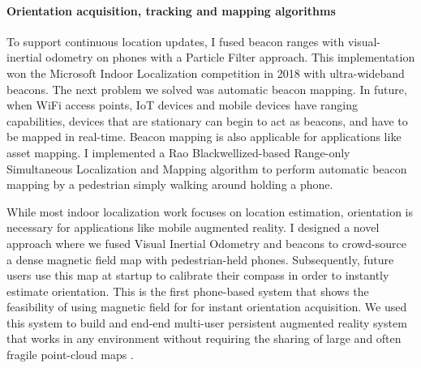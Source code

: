 \documentclass[10pt]{article}
\begin{document}

\paragraph{Orientation acquisition, tracking and mapping algorithms}


To support continuous location updates, I fused beacon ranges with visual-inertial odometry on phones with a Particle Filter approach. This implementation won the Microsoft Indoor Localization competition in 2018 with ultra-wideband beacons. The next problem we solved was automatic beacon mapping. In future, when WiFi access points, IoT devices and mobile devices have ranging capabilities, devices that are stationary can begin to act as beacons, and have to be mapped in real-time. Beacon mapping is also applicable for applications like asset mapping. I implemented a Rao Blackwellized-based Range-only Simultaneous Localization and Mapping algorithm to perform automatic beacon mapping by a pedestrian simply walking around holding a phone. 

While most indoor localization work focuses on location
estimation, orientation is necessary for applications like mobile
augmented reality. %
I designed a novel approach where we fused Visual
Inertial Odometry and beacons to crowd-source a dense magnetic field
map with pedestrian-held phones. Subsequently, future users use this map at startup to calibrate
their compass in order to instantly estimate orientation. %
This is the first phone-based system that shows the feasibility of using magnetic field for
for instant orientation acquisition. %
We used
this system to build and end-end multi-user persistent augmented
reality system that works in any environment without requiring the
sharing of large and often fragile point-cloud maps \cite{mobileAR}. 
\end{document}
